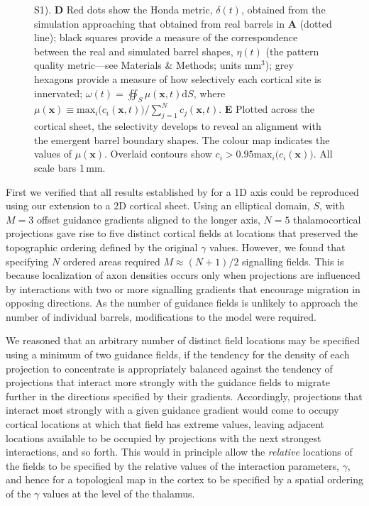 \documentclass[9pt,lineno]{elife}
\newcommand{\cmnt}[1]{\textcolor{colcmnt}{#1}}
\newcommand{\mpfive}[1]{\textcolor{colmpfive}{#1}}
\newcommand{\metrics}[1]{\textcolor{colmetrics}{#1}}
\newcommand{\mb}[1]{\mathbf{#1}}
\begin{document}
\begin{figure}
\begin{fullwidth}
{      S1). \textbf{D} Red dots show the Honda metric, \metrics{$\delta(t)$}, obtained from \metrics{the}
      simulation approaching that obtained from \metrics{real} barrels in \textbf{A} (dotted
      line); black squares \metrics{provide a} measure \metrics{of} the correspondence
      between the real and
      simulated barrel shapes, $\eta(t)$ (the \metrics{pattern quality metric---see
        Materials \& Methods; units mm$^3$});
      \metrics{grey hexagons \metrics{provide a measure of how selectively each
          cortical site is innervated};
        $\omega(t) = \oiint_{S} \mu(\mb{x},t) \mathrm{d}S$, where
        $\mu(\mb{x}) \equiv \mathrm{max}_i\big(c_i(\mb{x},t)\big)\big/\sum_{j=1}^{N} c_j(\mb{x},t)$.}
      \textbf{E} \metrics{Plotted across the cortical sheet, the selectivity
        develops to reveal an alignment with the emergent barrel boundary
        shapes}. \metrics{The colour map
        indicates the values of $\mu(\mb{x})$. Overlaid
        contours show $c_i > 0.95 \mathrm{max}_i\big(c_i(\mb{x})\big)$.} All scale bars 1\,mm.}
    \label{fig:main}
  \end{fullwidth}
\end{figure}

First we verified that all results established by \cite{karbowski_model_2004}
for a 1D axis could be reproduced using our extension to a 2D cortical
sheet. Using an elliptical domain, $S$, with $M=3$ offset guidance gradients
aligned to the longer axis, $N=5$ thalamocortical projections gave rise to
five distinct cortical fields at locations that preserved the topographic
ordering defined by the original $\gamma$ values. However, we found that
specifying $N$ ordered areas required $M\approx (N+1)/2$ signalling
fields. This is because localization of axon densities occurs only when
projections are influenced by interactions with two or more signalling
gradients that encourage migration in opposing directions. As the number of
guidance fields is unlikely to approach the number of individual barrels,
\cmnt{modifications to the model} were required.

\mpfive{We reasoned that an arbitrary number of distinct field locations may
  be specified using a minimum of two guidance fields, if the tendency for the
  density of each projection to concentrate is appropriately balanced against
  the tendency of projections that interact more strongly with the guidance
  fields to migrate further in the directions specified by their
  gradients. Accordingly, projections that interact most strongly with a given
  guidance gradient would come to occupy cortical locations at which that
  field has extreme values, leaving adjacent locations available to be
  occupied by projections with the next strongest interactions, and so
  forth. This would in principle allow the \emph{relative} locations of the
  fields to be specified by the relative values of the interaction parameters,
  $\gamma$, and hence for a topological map in the cortex to be specified by a
  spatial ordering of the $\gamma$ values at the level of the thalamus.}
\end{document}

